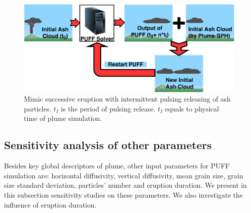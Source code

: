 \begin{figure}
\center
\includegraphics[width=0.90 \textwidth]{Chapter-7/Figures/Restart-PUFF.pdf} 
    \caption{Mimic successive eruption with intermittent pulsing releasing of ash particles. $t_I$ is the period of pulsing release. $t_I$ equals to physical time of plume simulation.}
    \label{fig:Restart-Puff}
\end{figure}

\subsection{Sensitivity analysis of other parameters}

Besides key global descriptors of plume, other input parameters for PUFF simulation are: horizontal diffusivity, vertical diffusivity, mean grain size, grain size standard deviation, particles' number and eruption duration. We present in this subsection sensitivity studies on these parameters. We also investigate the influence of eruption duration.

